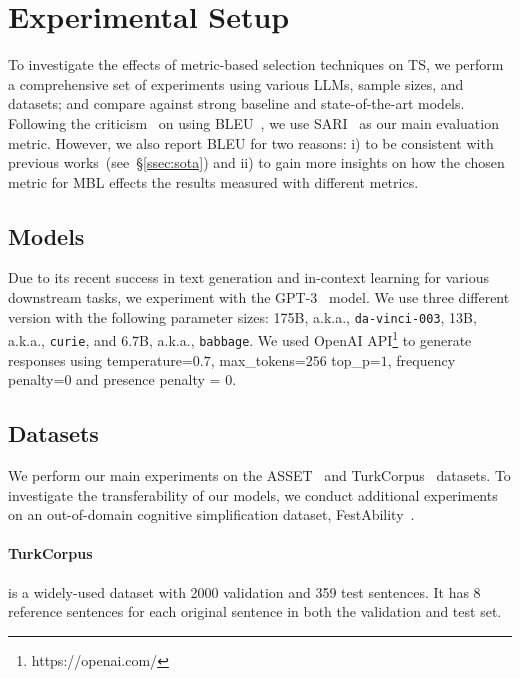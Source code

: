 \documentclass[11pt]{article}
\begin{document}
 

\section{Experimental Setup}
\label{sec:setup}
To investigate the effects of metric-based selection techniques on TS, we perform a comprehensive set of experiments using various LLMs, sample sizes, and datasets; and compare against strong baseline and state-of-the-art models. Following the criticism~\cite{sulem-etal-2018-bleu} on using BLEU~\citep{papineni-etal-2002-bleu}, we use SARI~\citep{xu-etal-2016-optimizing} as our main evaluation metric. However, we also report BLEU for two reasons: i) to be consistent with previous works~(see~\S \ref{ssec:sota}) and ii) to gain more insights on how the chosen metric for MBL effects the results measured with different metrics. 

\subsection{Models}
Due to its recent success in text generation and in-context learning for various downstream tasks, we experiment with the GPT-3~\citep{gpt3} model. We use three different version with the following parameter sizes: 175B, a.k.a., \texttt{da-vinci-003}, 13B, a.k.a., \texttt{curie}, and 6.7B, a.k.a., \texttt{babbage}. We used OpenAI API\footnote{https://openai.com/} to generate responses using temperature=$0.7$, max\_tokens=$256$ top\_p=$1$, frequency penalty=$0$ and presence penalty = $0$.

\subsection{Datasets}
    We perform our main experiments on the ASSET~\cite{alva-manchego-etal-2020-asset} and TurkCorpus~\cite{xu-etal-2016-optimizing} datasets. To investigate the transferability of our models, we conduct additional experiments on an out-of-domain cognitive simplification dataset, FestAbility~\cite{chamovitz2022cognitive}.
    
    \paragraph{TurkCorpus} is a widely-used dataset with 2000 validation and 359 test sentences. It has 8 reference sentences for each original sentence in both the validation and test set. 
     
\end{document}
